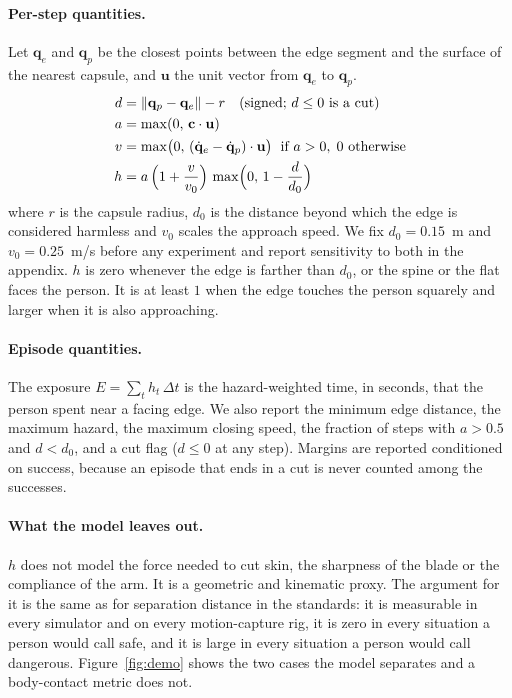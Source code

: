\documentclass[11pt,letterpaper]{article}
\begin{document}
\paragraph{Per-step quantities.}
Let $\mathbf{q}_e$ and $\mathbf{q}_p$ be the closest points between the edge segment and the surface of the nearest capsule, and $\mathbf{u}$ the unit vector from $\mathbf{q}_e$ to $\mathbf{q}_p$.
\begin{align}
d &= \lVert \mathbf{q}_p - \mathbf{q}_e \rVert - r \quad\text{(signed; } d \le 0 \text{ is a cut)}\\
a &= \max(0,\, \mathbf{c}\cdot\mathbf{u})\\
v &= \max\bigl(0,\, (\dot{\mathbf{q}}_e - \dot{\mathbf{q}}_p)\cdot\mathbf{u}\bigr) \;\text{ if } a > 0,\; 0 \text{ otherwise}\\
h &= a\,\Bigl(1 + \frac{v}{v_0}\Bigr)\,\max\Bigl(0,\, 1 - \frac{d}{d_0}\Bigr)
\end{align}
where $r$ is the capsule radius, $d_0$ is the distance beyond which the edge is considered harmless and $v_0$ scales the approach speed. We fix $d_0 = 0.15$~m and $v_0 = 0.25$~m/s before any experiment and report sensitivity to both in the appendix. $h$ is zero whenever the edge is farther than $d_0$, or the spine or the flat faces the person. It is at least $1$ when the edge touches the person squarely and larger when it is also approaching.

\paragraph{Episode quantities.}
The exposure $E = \sum_t h_t\,\Delta t$ is the hazard-weighted time, in seconds, that the person spent near a facing edge. We also report the minimum edge distance, the maximum hazard, the maximum closing speed, the fraction of steps with $a > 0.5$ and $d < d_0$, and a cut flag ($d \le 0$ at any step). Margins are reported conditioned on success, because an episode that ends in a cut is never counted among the successes.

\paragraph{What the model leaves out.}
$h$ does not model the force needed to cut skin, the sharpness of the blade or the compliance of the arm. It is a geometric and kinematic proxy. The argument for it is the same as for separation distance in the standards: it is measurable in every simulator and on every motion-capture rig, it is zero in every situation a person would call safe, and it is large in every situation a person would call dangerous. Figure~\ref{fig:demo} shows the two cases the model separates and a body-contact metric does not.
\end{document}
